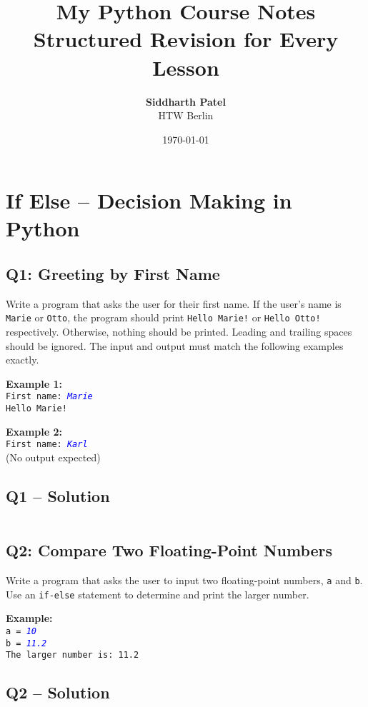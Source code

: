 \documentclass[a4paper,11pt]{article}
\title{\Huge \textbf{My Python Course Notes}\\[1ex]
	\Large Structured Revision for Every Lesson}
\author{\textbf{Siddharth Patel} \\ HTW Berlin}
\date{\today}
\begin{document}
	
	\maketitle
	\thispagestyle{empty}
	\newpage
	\tableofcontents
	\newpage
	
	\section{If Else – Decision Making in Python}
	
	\subsection*{Q1: Greeting by First Name}
	Write a program that asks the user for their first name. If the user's name is \texttt{Marie} or \texttt{Otto}, the program should print \texttt{Hello Marie!} or \texttt{Hello Otto!} respectively. Otherwise, nothing should be printed. Leading and trailing spaces should be ignored. The input and output must match the following examples exactly.
	
	\textbf{Example 1:}\\
	\texttt{First name: \textcolor{blue}{\textit{Marie}}}\\
	\texttt{Hello Marie!}
	
	\textbf{Example 2:}\\
	\texttt{First name: \textcolor{blue}{\textit{Karl}}}\\
	(No output expected)
	
		\subsection*{Q1 – Solution}
		\inputminted{python}{Files/1/1.py}
	
	\subsection*{Q2: Compare Two Floating-Point Numbers}
	Write a program that asks the user to input two floating-point numbers, \texttt{a} and \texttt{b}. Use an \texttt{if-else} statement to determine and print the larger number.
	
	\textbf{Example:}\\
	\texttt{a = \textcolor{blue}{\textit{10}}}\\
	\texttt{b = \textcolor{blue}{\textit{11.2}}}\\
	\texttt{The larger number is: 11.2}
	
		
	\subsection*{Q2 – Solution}
		\inputminted{python}{Files/1/2.py}
	
\end{document}

